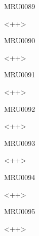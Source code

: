 \documentclass{article}
\begin{document}
\begin{corrige}{MRU0089}

<++>

\end{corrige}%


\begin{corrige}{MRU0090}

<++>

\end{corrige}%


\begin{corrige}{MRU0091}

<++>

\end{corrige}%


\begin{corrige}{MRU0092}

<++>

\end{corrige}%


\begin{corrige}{MRU0093}

<++>

\end{corrige}%


\begin{corrige}{MRU0094}

<++>

\end{corrige}%


\begin{corrige}{MRU0095}

<++>

\end{corrige}%
\end{document}
